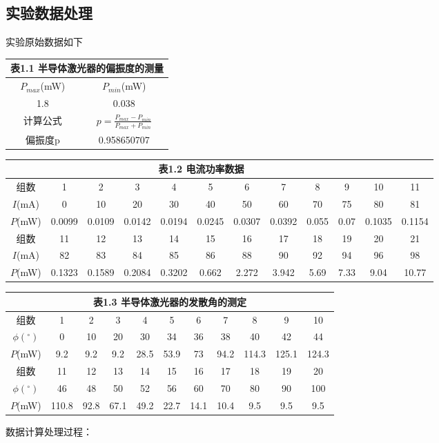 \documentclass{zjureport}
\begin{document}
\subsection{实验数据处理}
\begin{clause}
	\item 实验原始数据如下\\
	\begin{center}
	\begin{tabular}{|c|c|}
		\multicolumn{2}{c}{表1.1 半导体激光器的偏振度的测量}\\\hline
		$P_{max}$(mW)&	$P_{min}$(mW)\\\hline
		1.8	&		0.038\\\hline
		计算公式&$p=\frac{P_{max}-P_{min}}{P_{max}+P_{min}}$\\\hline	
		偏振度p	&0.958650707\\\hline	
	\end{tabular}
	\end{center}
	\begin{center}
		\begin{tabular}{|c|c|c|c|c|c|c|c|c|c|c|c|}
			\multicolumn{11}{c}{表1.2 电流功率数据}\\\hline
			组数&1&2&3&4&5&6&7&8&9&10&11\\\hline
			$I$(mA)&0&10&20&30&40&50&60&70&75&80&81\\\hline		
			$P$(mW)&0.0099&	0.0109&0.0142&	0.0194&	0.0245&	0.0307&	0.0392&	0.055&	0.07&	0.1035&0.1154\\\hline
			组数&11&12&13&14&15&16&17&18&19&20&21\\\hline
			$I$(mA)&82&83&84&85&86&88&90&92&94&96&98\\\hline		
			$P$(mW)&0.1323&0.1589&0.2084&0.3202&0.662&2.272&3.942&5.69&	7.33&9.04&10.77\\\hline
		\end{tabular}
	\end{center}
	\begin{center}
		\begin{tabular}{|c|c|c|c|c|c|c|c|c|c|c|}
			\multicolumn{11}{c}{表1.3 半导体激光器的发散角的测定}\\\hline
				组数&1&2&3&4&5&6&7&8&9&10\\\hline
				$\phi(^{\circ})$&0&10&20&30&34&36&38&40&42&44\\\hline
				$P$(mW)&9.2&9.2&9.2&28.5&53.9&73&94.2&114.3&125.1&124.3\\\hline
				组数&11&12&13&14&15&16&17&18&19&20\\\hline
				$\phi(^{\circ})$&46&48&50&52&56&60&70&80&90&100 \\\hline
				$P$(mW)&110.8&92.8&67.1&49.2&22.7&14.1&10.4&9.5&9.5&9.5 \\\hline
		\end{tabular}
	\end{center}
	\item 数据计算处理过程：
	

\end{clause}
\end{document}
